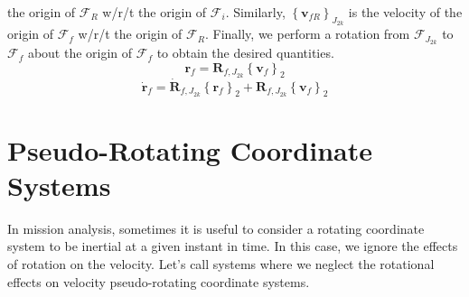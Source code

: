 the origin of $\mathcal{F}_R$ w/r/t the origin of $\mathcal{F}_i$.
Similarly, $\left\{\mathbf{v}_{fR}\right\}_{J_{2k}}$ is the
velocity of the origin of $\mathcal{F}_f$ w/r/t the origin of
$\mathcal{F}_R$. Finally, we perform a rotation from
$\mathcal{F}_{J_{2k}}$ to $\mathcal{F}_f$ about the origin of
$\mathcal{F}_f$ to obtain the desired quantities.
%
\begin{equation}
    \mathbf{r}_f = \mathbf{R}_{f,J_{2k}}
    \left\{\mathbf{v}_f\right\}_{2} \label{Eq:PosRot2}
\end{equation}
%
\begin{equation}
  \dot{\mathbf{r}}_f = \dot{\mathbf{R}}_{f,J_{2k}}\left\{\mathbf{r}_f\right\}_{2} + \mathbf{R}_{f,J_{2k}}\left\{\mathbf{v}_f\right\}_{2}
   \label{Eq:VelRot2}
 \end{equation}
%
%





\section{Pseudo-Rotating Coordinate\\ Systems} \label{Sec:PseudoRotating}

In mission analysis, sometimes it is useful to consider a rotating
coordinate system to be inertial at a given instant in time. In this
case, we ignore the effects of rotation on the velocity.  Let's call
systems where we neglect the rotational effects on velocity
 pseudo-rotating coordinate systems.

